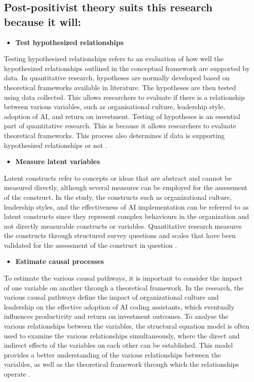 \subsection {Post-positivist theory suits this research because it will: }
\label{sec:Post-positivist theory suits this research because it will}
\begin{itemize}
	\item \textbf{Test hypothesized relationships} 
\end{itemize}
Testing hypothesized relationships refers to an evaluation of how well the hypothesized relationships outlined in the conceptual framework are supported by data. In quantitative research, hypotheses are normally developed based on theoretical frameworks available in literature. The hypotheses are then tested using data collected. This allows researchers to evaluate if there is a relationship between various variables, such as organisational culture, leadership style, adoption of AI, and return on investment. Testing of hypotheses is an essential part of quantitative research. This is because it allows researchers to evaluate theoretical frameworks. This process also determines if data is supporting hypothesized relationships or not \autocite{Creswell2018}.

\begin{itemize}
	\item \textbf{Measure latent variables} 
\end{itemize}
Latent constructs refer to concepts or ideas that are abstract and cannot be measured directly, although several measures can be employed for the assessment of the construct. In the study, the constructs such as organizational culture, leadership styles, and the effectiveness of AI implementation can be referred to as latent constructs since they represent complex behaviours in the organization and not directly measurable constructs or variables. Quantitative research measures the constructs through structured survey questions and scales that have been validated for the assessment of the construct in question \autocite{Hair2019}.

\begin{itemize}
	\item \textbf{Estimate causal processes} 
\end{itemize}
To estimate the various causal pathways, it is important to consider the impact of one variable on another through a theoretical framework. In the research, the various causal pathways define the impact of organizational culture and leadership on the effective adoption of AI coding assistants, which eventually influences productivity and return on investment outcomes. To analyse the various relationships between the variables, the structural equation model is often used to examine the various relationships simultaneously, where the direct and indirect effects of the variables on each other can be established. This model provides a better understanding of the various relationships between the variables, as well as the theoretical framework through which the relationships operate \autocite{Hair2019}.

